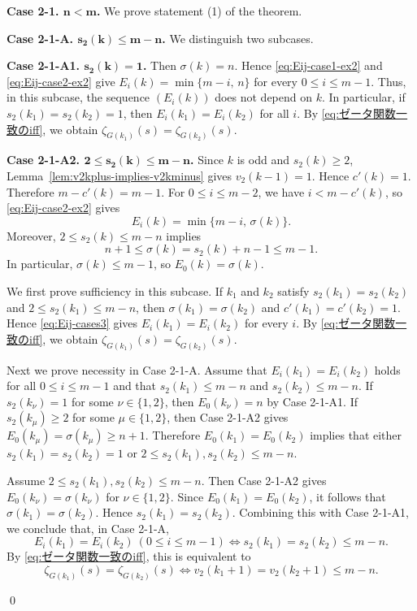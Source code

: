 \documentclass[onecolumn]{article}
\makeatletter
\numberwithin{equation}{section}
\theoremstyle{mytheoremstyle}
\renewenvironment{proof}[1][\proofname]{%
  \par\normalfont 
  \topsep6pt\relax 
  \trivlist\item[\hskip\labelsep\itshape #1\@addpunct{.}]\ignorespaces
}{%
  \qed\endtrivlist\@endpefalse
}
\makeatother
\begin{document}
\begin{proof}
\medskip\noindent
\textbf{Case 2-1. $\bm{n<m}$.}
We prove statement \textup{(1)} of the theorem.

\medskip\noindent
\textbf{Case 2-1-A. $\bm{s_{2}(k)\le m-n}$.}
We distinguish two subcases.

\medskip\noindent
\textbf{Case 2-1-A1. $\bm{s_{2}(k)=1}$.}
Then $\sigma(k)=n$.
Hence \eqref{eq:Eij-case1-ex2} and \eqref{eq:Eij-case2-ex2} give
$E_{i}(k)=\min\{m-i,\,n\}$ for every $0\le i\le m-1$.
Thus, in this subcase, the sequence $(E_i(k))$ does not depend on $k$.
In particular, if $s_{2}(k_{1})=s_{2}(k_{2})=1$, then $E_{i}(k_{1})=E_{i}(k_{2})$ for all $i$.
By \eqref{eq:ゼータ関数一致のiff}, we obtain
$\zeta_{G(k_{1})}(s)=\zeta_{G(k_{2})}(s)$.

\medskip\noindent
\textbf{Case 2-1-A2. $\bm{2\le s_{2}(k)\le m-n}$.}
Since $k$ is odd and $s_{2}(k)\ge 2$, Lemma~\ref{lem:v2kplus-implies-v2kminus} gives $v_{2}(k-1)=1$.
Hence $c'(k)=1$.
Therefore $m-c'(k)=m-1$.
For $0\le i\le m-2$, we have $i<m-c'(k)$, so \eqref{eq:Eij-case2-ex2} gives
\[
  E_{i}(k)=\min\{m-i,\,\sigma(k)\}.
\]
Moreover, $2\le s_{2}(k)\le m-n$ implies
\[
  n+1\le \sigma(k)=s_{2}(k)+n-1\le m-1.
\]
In particular, $\sigma(k)\le m-1$, so $E_{0}(k)=\sigma(k)$.

We first prove sufficiency in this subcase.
If $k_{1}$ and $k_{2}$ satisfy $s_{2}(k_{1})=s_{2}(k_{2})$ and $2\le s_{2}(k_{1})\le m-n$,
then $\sigma(k_{1})=\sigma(k_{2})$ and $c'(k_{1})=c'(k_{2})=1$.
Hence \eqref{eq:Eij-cases3} gives $E_{i}(k_{1})=E_{i}(k_{2})$ for every $i$.
By \eqref{eq:ゼータ関数一致のiff}, we obtain
$\zeta_{G(k_{1})}(s)=\zeta_{G(k_{2})}(s)$.

Next we prove necessity in Case 2-1-A.
Assume that $E_{i}(k_{1})=E_{i}(k_{2})$ holds for all $0\le i\le m-1$ and that
$s_{2}(k_{1})\le m-n$ and $s_{2}(k_{2})\le m-n$.
If $s_{2}(k_{\nu})=1$ for some $\nu\in\{1,2\}$, then $E_{0}(k_{\nu})=n$ by Case 2-1-A1.
If $s_{2}(k_{\mu})\ge 2$ for some $\mu\in\{1,2\}$, then Case 2-1-A2 gives
$E_{0}(k_{\mu})=\sigma(k_{\mu})\ge n+1$.
Therefore $E_{0}(k_{1})=E_{0}(k_{2})$ implies that either
$s_{2}(k_{1})=s_{2}(k_{2})=1$ or $2\le s_{2}(k_{1}),s_{2}(k_{2})\le m-n$.

Assume $2\le s_{2}(k_{1}),s_{2}(k_{2})\le m-n$.
Then Case 2-1-A2 gives $E_{0}(k_{\nu})=\sigma(k_{\nu})$ for $\nu\in\{1,2\}$.
Since $E_{0}(k_{1})=E_{0}(k_{2})$, it follows that $\sigma(k_{1})=\sigma(k_{2})$.
Hence $s_{2}(k_{1})=s_{2}(k_{2})$.
Combining this with Case 2-1-A1, we conclude that, in Case 2-1-A,
\[
  E_{i}(k_{1})=E_{i}(k_{2})\ (0\le i\le m-1)
  \iff
  s_{2}(k_{1})=s_{2}(k_{2})\le m-n.
\]
By \eqref{eq:ゼータ関数一致のiff}, this is equivalent to
\[
  \zeta_{G(k_{1})}(s)=\zeta_{G(k_{2})}(s)
  \iff
  v_{2}(k_{1}+1)=v_{2}(k_{2}+1)\le m-n.
\]


\end{proof}
\end{document}

